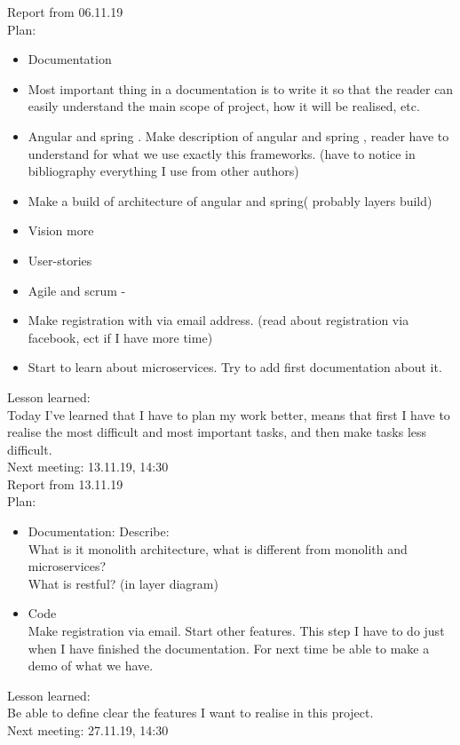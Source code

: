 \documentclass{scrartcl}
\begin{document}
Report from 06.11.19\\
Plan:\\
\begin{itemize}


	\item	Documentation
	\item	Most important thing in a documentation is to write it so that the reader can easily understand the main scope of project, how it will be realised, etc.  
	\item	Angular and spring . Make description of angular and spring , reader have to understand for what we use exactly this frameworks. (have to notice in bibliography everything I use from other authors)
	\item	Make a build of architecture of angular and spring( probably layers build)
	\item	Vision more
	\item	User-stories
	\item	Agile and scrum -\/
	\item	Make registration with via email address. (read about registration via facebook, ect if I have more time)
	\item	 Start to learn about microservices. Try to add first documentation about it. 
\end{itemize}
Lesson learned:\\
Today I’ve learned that I have to plan my work better, means that first I have to realise the most difficult and most important tasks, and then make tasks less difficult. \\
 
Next meeting: 13.11.19, 14:30\\





Report from 13.11.19\\

Plan:\\
\begin{itemize}
	\item	Documentation: 
Describe:\\
        What is it monolith architecture, what is different from monolith and microservices?\\
       What is restful? (in layer diagram)\\
	\item	Code \\
Make registration via email. Start other features. This step I have to do just when I have finished the documentation.
For next time be able to make a demo of what we have.
\end{itemize}

Lesson learned:\\
Be able to define clear the features I want to realise in this project.\\
Next meeting: 27.11.19, 14:30
\end{document}

